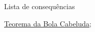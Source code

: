 \begin{titlemize}{Lista de consequências}
	\item \hyperref[teorema-bola-cabeluda-prop]{Teorema da Bola Cabeluda};\\ %
\end{titlemize}

